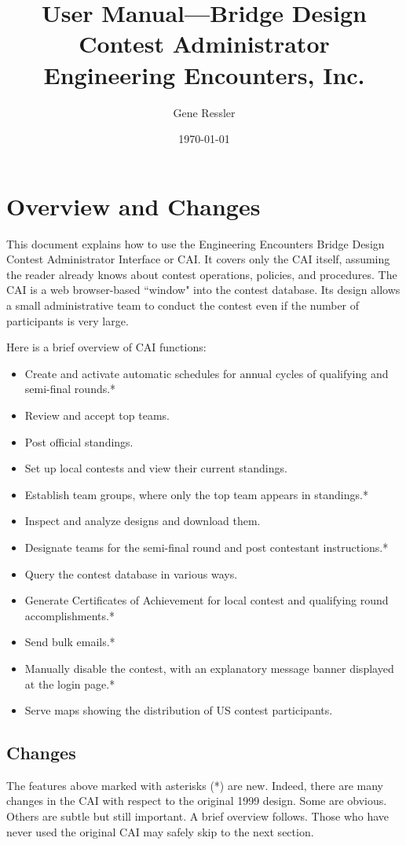 \documentclass[11pt,letterpaper]{refart}
\title{User Manual---Bridge Design Contest Administrator \\[1ex]
\small Engineering Encounters, Inc.}
\author{Gene Ressler}
\date{\today}
\begin{document}
\maketitle
\tableofcontents\newpage

\section{Overview and Changes}
This document explains how to use the Engineering Encounters Bridge Design 
Contest Administrator
Interface or CAI. It covers only the CAI itself, assuming the reader already knows
about contest operations, policies, and procedures. The CAI is a web browser-based 
``window" into the contest database. Its design allows a small administrative
team to conduct the contest even if the number of participants is very large. 

Here is a brief overview of CAI functions:
\begin{itemize}
\item Create and activate automatic schedules for annual cycles of qualifying and semi-final rounds.*
\item Review and accept top teams.
\item Post official standings.
\item Set up local contests and view their current standings.
\item Establish team groups, where only the top team appears in standings.*
\item Inspect and analyze designs and download them.
\item Designate teams for the semi-final round and post contestant instructions.*
\item Query the contest database in various ways.
\item Generate Certificates of Achievement for local contest and qualifying round accomplishments.*
\item Send bulk emails.*
\item Manually disable the contest, with an explanatory message banner displayed at
 the login page.*
\item Serve maps showing the distribution of US contest participants.
\end{itemize}

\subsection{Changes}
The features above marked with asterisks (*) are new. Indeed, there are many 
changes in the CAI with respect to the original 1999 design. Some are
obvious. Others are subtle but still important. A brief overview follows. Those who
have never used the original CAI may safely skip to the next section.
\end{document}
